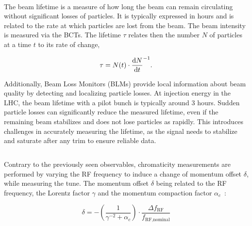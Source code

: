 \paragraph{}

The beam lifetime is a measure of how long the beam can remain circulating without significant
losses of particles. It is typically expressed in hours and is related to the rate
at which particles are lost from the beam. The beam intensity is measured via the BCTs. The lifetime
$\tau$ relates then the number $N$ of particles at a time $t$ to its rate of change,

\begin{equation}
    \tau = N(t) \cdot \frac{\mathop{}\!\mathrm{d} N}{\mathop{}\!\mathrm{d} t}^{-1}.
\end{equation}

Additionally, Beam Loss Monitors (BLMs) provide local information about beam quality by detecting
and localizing particle losses. At injection energy in the LHC, the beam lifetime with a pilot bunch
is typically around 3 hours. Sudden particle losses can significantly reduce the measured lifetime,
even if the remaining beam stabilizes and does not lose particles as rapidly. This introduces
challenges in accurately measuring the lifetime, as the signal needs to stabilize and saturate after
any trim to ensure reliable data.


\subsection{}
\label{subsection:optics_corrections_chromaticity}


Contrary to the previously seen observables, chromaticity measurements are performed by varying
the RF frequency to induce a change of momentum offset $\delta$, while measuring the tune. The
momentum offset $\delta$ being related to the RF frequency, the Lorentz factor $\gamma$ and the
momentum compaction factor $\alpha_c$~\cite{keintzel_jacqueline_beam_nodate}:

\begin{equation}
    \delta = - \left(\frac{1}{\gamma^{-2} + \alpha_c}\right) \cdot \frac{\Delta f_{\text{RF}}}{f_{\text{RF,nominal}}}
    \label{eq:dpp_rf}
\end{equation}

